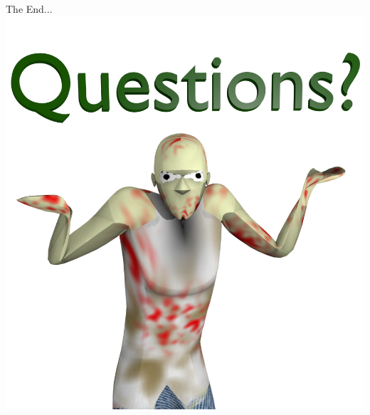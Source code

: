 \documentclass[10pt]{beamer}
\begin{document}
	\begin{frame}{The End...}
	    \includegraphics[scale=0.5]{questions.png}
	\end{frame}
\end{document}
